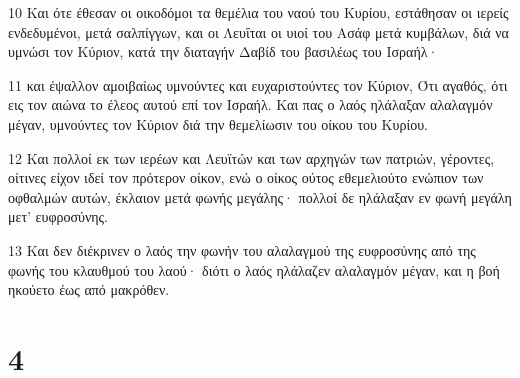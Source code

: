 \par 10 Και ότε έθεσαν οι οικοδόμοι τα θεμέλια του ναού του Κυρίου, εστάθησαν οι ιερείς ενδεδυμένοι, μετά σαλπίγγων, και οι Λευΐται οι υιοί του Ασάφ μετά κυμβάλων, διά να υμνώσι τον Κύριον, κατά την διαταγήν Δαβίδ του βασιλέως του Ισραήλ·
\par 11 και έψαλλον αμοιβαίως υμνούντες και ευχαριστούντες τον Κύριον, Ότι αγαθός, ότι εις τον αιώνα το έλεος αυτού επί τον Ισραήλ. Και πας ο λαός ηλάλαξαν αλαλαγμόν μέγαν, υμνούντες τον Κύριον διά την θεμελίωσιν του οίκου του Κυρίου.
\par 12 Και πολλοί εκ των ιερέων και Λευϊτών και των αρχηγών των πατριών, γέροντες, οίτινες είχον ιδεί τον πρότερον οίκον, ενώ ο οίκος ούτος εθεμελιούτο ενώπιον των οφθαλμών αυτών, έκλαιον μετά φωνής μεγάλης· πολλοί δε ηλάλαξαν εν φωνή μεγάλη μετ' ευφροσύνης.
\par 13 Και δεν διέκρινεν ο λαός την φωνήν του αλαλαγμού της ευφροσύνης από της φωνής του κλαυθμού του λαού· διότι ο λαός ηλάλαζεν αλαλαγμόν μέγαν, και η βοή ηκούετο έως από μακρόθεν.

\chapter{4}

